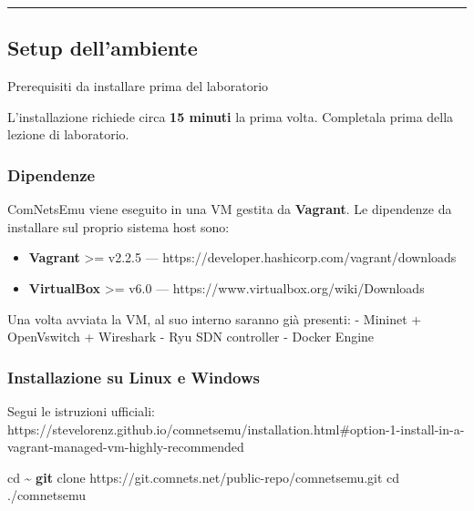 \documentclass[
  italian,
  openany]{book}
\newenvironment{Shaded}{\begin{snugshade}}{\end{snugshade}}
\newcommand{\BuiltInTok}[1]{#1}
\newcommand{\FunctionTok}[1]{\textcolor[rgb]{0.13,0.29,0.53}{\textbf{#1}}}
\newcommand{\NormalTok}[1]{#1}
\providecommand{\tightlist}{%
  \setlength{\itemsep}{0pt}\setlength{\parskip}{0pt}}
\begin{document}
\begin{center}\rule{0.5\linewidth}{0.5pt}\end{center}

\subsection{Setup dell'ambiente}\label{setup-dellambiente}

\begin{calloutwarning}{Prerequisiti da installare prima del laboratorio}

L'installazione richiede circa \textbf{15 minuti} la prima volta.
Completala prima della lezione di laboratorio.

\end{calloutwarning}

\subsubsection{Dipendenze}\label{dipendenze}

ComNetsEmu viene eseguito in una VM gestita da \textbf{Vagrant}. Le
dipendenze da installare sul proprio sistema host sono:

\begin{itemize}
\tightlist
\item
  \textbf{Vagrant} \textgreater= v2.2.5 ---
  https://developer.hashicorp.com/vagrant/downloads
\item
  \textbf{VirtualBox} \textgreater= v6.0 ---
  https://www.virtualbox.org/wiki/Downloads
\end{itemize}

Una volta avviata la VM, al suo interno saranno già presenti: - Mininet
+ OpenVswitch + Wireshark - Ryu SDN controller - Docker Engine

\subsubsection{Installazione su Linux e
Windows}\label{installazione-su-linux-e-windows}

Segui le istruzioni ufficiali:
https://stevelorenz.github.io/comnetsemu/installation.html\#option-1-install-in-a-vagrant-managed-vm-highly-recommended

\begin{Shaded}
\begin{Highlighting}[]
\BuiltInTok{cd}\NormalTok{ \textasciitilde{}}
\FunctionTok{git}\NormalTok{ clone https://git.comnets.net/public{-}repo/comnetsemu.git}
\BuiltInTok{cd}\NormalTok{ ./comnetsemu}
\end{Highlighting}
\end{Shaded}
\end{document}
